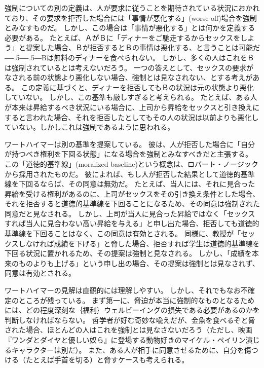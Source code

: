\documentclass[paper=a4,book,openany]{jlreq}
\newcommand{\ig}[1]{}           %
\def\DDASH{―\kern-.5\zw―\kern-.5\zw―} %
\begin{document}
強制についての別の定義は、人が要求に従うことを期待されている状況におかれており、その要求を拒否した場合には「事情が悪化する」(worse off)場合を強制とみなすものだ。
しかし、この場合は「事情が悪化する」とは何かを定義する必要がある。
たとえば、ＡがＢに「ディナーをご馳走するからセックスをしよう」と提案した場合、Ｂが拒否するとＢの事情は悪化する、と言うことは可能だ{\DDASH}Bは無料のディナーを食べられない。
しかし、多くの人はこれをＢは強制されているとは考えないだろう。
一つの答えとして、セックスの要求がなされる前の状態より悪化しない場合、強制とは見なされない、とする考えがある。
この定義に基づくと、ディナーを拒否してもＢの状況は元の状態より悪化していない。
しかし、この基準も厳しすぎると考えられる。
たとえば、ある人が本来は昇給するべき状況にいる場合に、上司から昇給をセックスと引き換えにすると言われた場合、それを拒否したとしてもその人の状況は以前よりも悪化していない。しかしこれは強制であるように思われる。

ワートハイマーは別の基準を提案している。
彼は、人が拒否した場合に「自分が持つべき権利を下回る状態」になる場合を強制とみなすべきだと主張する。
この「道徳的基準線」(moralized baseline)という概念は、ロバート・ノージック\ig{Robert Nozick}から採用されたものだ。
彼によれば、もし人が拒否した結果として道徳的基準線を下回るならば、その同意は無効だ\citep[pp.167--169]{wertheimer03:_consen_sexual_relat}。
たとえば、当人には、それに見合った昇給を受ける権利があるのに、上司がセックスをその引き換え条件とした場合、それを拒否すると道徳的基準線を下回ることになるため、その同意は強制された同意だと見なされる。
しかし、上司が当人に見合った昇給ではなく「セックスすれば当人に見合わない高い昇給を与える」と申し出た場合、拒否しても道徳的基準線を下回ることはなく、この同意は有効とされる。
同様に、教授が「セックスしなければ成績を下げる」と脅した場合、拒否すれば学生は道徳的基準線を下回る状況に置かれるため、その提案は強制と見なされる。
しかし、「成績を本来のものよりも上げる」という申し出の場合、その提案は強制とは見なされず、同意は有効とされる。

ワートハイマーの見解は直観的には理解しやすい。
しかし、それでもなお不確定のところが残っている。
まず第一に、脅迫が本当に強制的なものとなるためには、どの程度深刻な｛福利｝{ウェルビーイング}の損失である必要があるのかを判断しなければならない。
哲学者が好む奇妙な喩えだが、金魚を食べるぞと脅された場合、ほとんどの人はこれを強制とは見なさないだろう（ただし、映画『ワンダとダイヤと優しい奴ら』に登場する動物好きのマイケル・ペイリン演じるキャラクターは別だ）。
また、ある人が相手に同意させるために、自分を傷つける（たとえば手首を切る）と脅すケースも考えられる\citep[p.280]{husak06:_compl_guide_consen_sex}。
\end{document}

